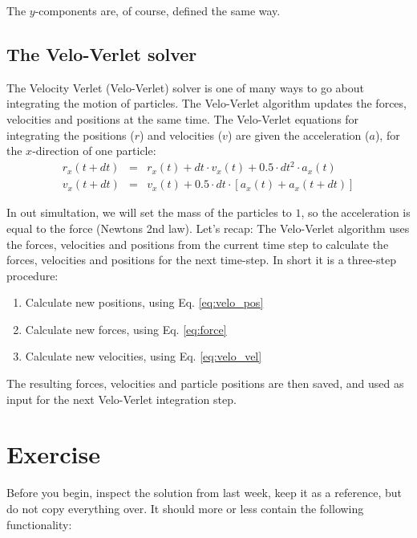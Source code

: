 \documentclass{article}
\begin{document}
The $y$-components are, of course, defined the same way.

\subsection{The Velo-Verlet solver}

The Velocity Verlet (Velo-Verlet) solver is one of many ways to go about integrating the motion of particles.
The Velo-Verlet algorithm updates the forces, velocities and positions at the same time.
The Velo-Verlet equations for integrating the positions ($r$) and velocities ($v$) are given the acceleration ($a$), for the $x$-direction of one particle:
\begin{eqnarray}
    r_x(t+dt)   &=& r_x(t) + dt \cdot v_x(t) + 0.5 \cdot dt^2 \cdot a_x(t) \label{eq:velo_pos} \\
    v_x(t + dt) &=& v_x(t) + 0.5 \cdot dt \cdot \left [ a_x(t) + a_x(t+dt) \right ] \label{eq:velo_vel}
\end{eqnarray}

In out simultation, we will set the mass of the particles to $1$, so the acceleration is equal to the force (Newtons 2nd law).
Let's recap: The Velo-Verlet algorithm uses the forces,
velocities and positions from the current time step to calculate the forces,
velocities and positions for the next time-step.
In short it is a three-step procedure:

\begin{enumerate}
    \item Calculate new positions, using Eq. \ref{eq:velo_pos}
    \item Calculate new forces, using Eq. \ref{eq:force}
    \item Calculate new velocities, using Eq. \ref{eq:velo_vel}
\end{enumerate}

The resulting forces, velocities and particle positions are then saved, and used as input for the next Velo-Verlet integration step.

\newpage
\clearpage
\section{Exercise}

Before you begin, inspect the solution from last week, keep it as a reference, but do not copy everything over.
It should more or less contain the following functionality:
\end{document}
